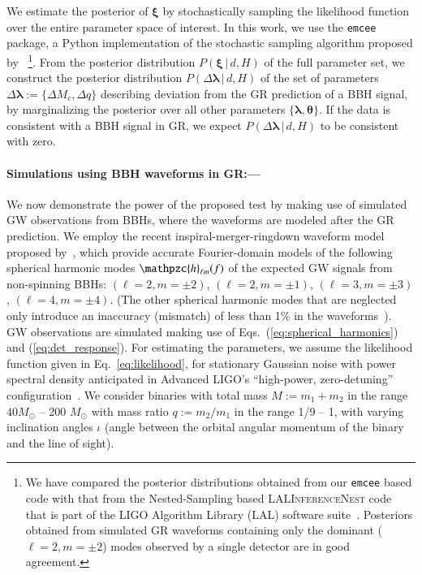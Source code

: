 \documentclass[prl,preprintnumbers,twocolumn,eqsecnum,floatfix,a4paper,nofootinbib,superscriptaddress]{revtex4}
\newcommand{\h}{\mathpzc{h}}
\newcommand{\blambda}{\bm{\lambda}}
\newcommand{\btheta}{\bm{\theta}}
\newcommand{\bxi}{\bm{\xi}}
\begin{document}
We estimate the posterior of $\bxi$ by stochastically sampling the likelihood function over the entire parameter space of interest. In this work, we use the \texttt{emcee}~\cite{foreman2013emcee} package, a Python implementation of the 
stochastic sampling algorithm proposed by \cite{goodman2010ensemble}~\footnote{We have compared the posterior distributions obtained from our \texttt{emcee} based code with that from the Nested-Sampling based \textsc{LALInferenceNest} code~\cite{Veitch:2009hd} that is part of the LIGO Algorithm Library (LAL) software suite~\cite{LALsuite}. Posteriors obtained from simulated GR waveforms containing only the dominant ($\ell = 2, m = \pm 2$) modes observed by a single detector are in good agreement.}. From the posterior distribution $P(\bxi \, | \, d, H)$ of the full parameter set, we construct the posterior distribution $P(\Delta \blambda \, | \, d, H)$ of the set of parameters $\Delta \blambda := \{\Delta M_c, \Delta q\}$ describing deviation from the GR prediction of a BBH signal, by marginalizing the posterior over all other parameters $\{\blambda, \btheta\}$. If the data is consistent with a BBH signal in GR, we expect $P(\Delta \blambda \, | \, d, H)$ to be consistent with zero. 

\paragraph{Simulations using BBH waveforms in GR:---}
We now demonstrate the power of the proposed test by making use of simulated GW observations from BBHs, where the waveforms are modeled after the GR prediction. We employ the recent inspiral-merger-ringdown waveform model proposed by~\cite{Mehta:2017jpq}, which provide accurate Fourier-domain models of the following spherical harmonic modes $\h_{\ell m}(f)$ of the expected GW signals from non-spinning BBHs: $(\ell = 2, m = \pm2)$, $(\ell = 2, m=\pm1)$, $(\ell = 3, m=\pm3)$, $(\ell = 4, m = \pm4)$. (The other spherical harmonic modes that are neglected only introduce an inaccuracy (mismatch) of less than 1\% in the waveforms~\cite{Mehta:2017jpq}). 
GW observations are simulated making use of Eqs.~(\ref{eq:spherical_harmonics}) and (\ref{eq:det_response}). For estimating the parameters, we assume the likelihood function given in Eq.~\eqref{eq:likelihood}, for stationary Gaussian noise with power spectral density anticipated in Advanced LIGO's ``high-power, zero-detuning'' configuration~\cite{aLIGOZeroDetHighPower}. We consider binaries with total mass $M := m_1 + m_2$ in the range $40 M_\odot$ -- 200 $M_\odot$ with mass ratio $q := m_2/m_1$ in the range 1/9 -- 1, with varying inclination angles $\iota$ (angle between the orbital angular momentum of the binary and the line of sight). 
\end{document}
